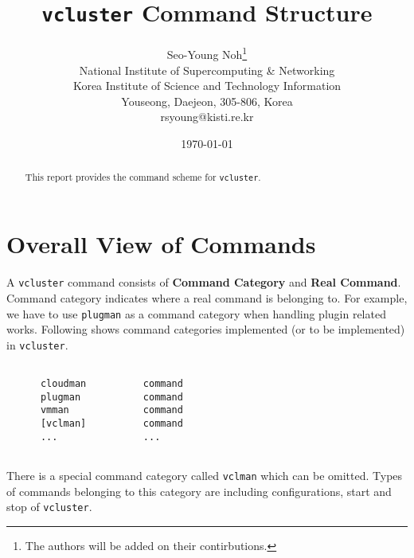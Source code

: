 \documentclass[11pt]{article}
\def \ttt{\texttt}
\def \tbf{\textbf}
\def \vb{\verb}
\begin{document}
\title{\ttt{vcluster} Command Structure}
\author{
        Seo-Young Noh\thanks{The authors will be added on their contirbutions.} \\
        $ $\\
        National Institute of Supercomputing \& Networking\\
        Korea Institute of Science and Technology Information\\
        Youseong, Daejeon, 305-806, Korea\\
        {rsyoung}@kisti.re.kr
}
\date{\today}



\maketitle

\begin{abstract}
This report provides the command scheme for \ttt{vcluster}.
\end{abstract}


\section{Overall View of Commands}

A \vb+vcluster+ command consists of \tbf{Command Category} and \tbf{Real Command}. Command category indicates where a real command is belonging to. For example, we have to use \vb+plugman+ as a command category when handling plugin related works. Following shows command categories implemented (or to be implemented) in \vb+vcluster+.

\begin{Verbatim}[fontfamily=courier, fontsize = \small, obeytabs
=true, tabsize=4, frame=lines]

      cloudman          command
      plugman           command
      vmman             command
      [vclman]          command
      ...               ...
  
\end{Verbatim}

There is a special command category called \vb+vclman+ which can be omitted. Types of commands belonging to this category are including configurations, start and stop of \vb+vcluster+.
\end{document}
